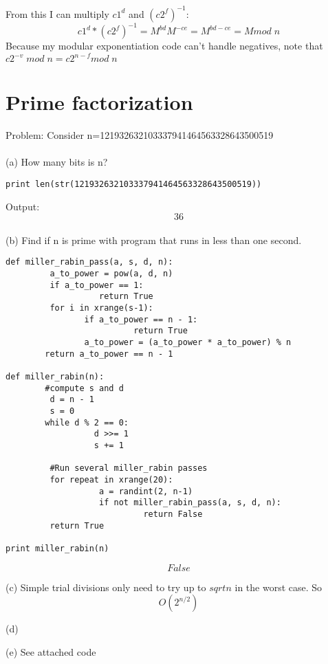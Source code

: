 \documentclass[12pt]{article}
\begin{document}
From this I can multiply $c1^d$ and $(c2^f)^{-1}$: \[c1^d * (c2^f)^{-1} = M^{bd}M^{-ce} = M^{bd-ce}=M mod  \; n\]
Because my modular exponentiation code can't handle negatives, note that $c2^{-v} \; mod \; n = c2^{n-f} mod \; n$


\section{Prime factorization}

Problem: Consider n=121932632103337941464563328643500519
\\\\(a) How many bits is n?
\begin{verbatim}
print len(str(121932632103337941464563328643500519))
\end{verbatim}
Output:  \[\boxed{36}\] 
\\(b) Find if n is prime with program that runs in less than one second.
\begin{verbatim}
def miller_rabin_pass(a, s, d, n):
         a_to_power = pow(a, d, n)
         if a_to_power == 1:
                   return True
         for i in xrange(s-1):
                if a_to_power == n - 1:
                          return True
                a_to_power = (a_to_power * a_to_power) % n
        return a_to_power == n - 1

def miller_rabin(n):
        #compute s and d
         d = n - 1
         s = 0
        while d % 2 == 0:
                  d >>= 1
                  s += 1

         #Run several miller_rabin passes
         for repeat in xrange(20):
                   a = randint(2, n-1)
                   if not miller_rabin_pass(a, s, d, n):
                            return False
         return True

print miller_rabin(n)

\end{verbatim}

\[
\boxed{False}
\]

(c) Simple trial divisions only need to try up to  $sqrt{n}$ in the worst case. So \[
\boxed{O(2^{n/2})}
\]

(d) 

(e) See attached code
\end{document}
